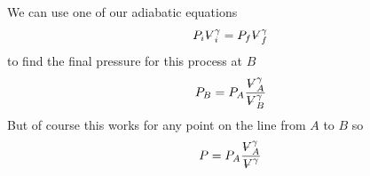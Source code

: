 \documentclass{article}
\begin{document}
We can use one of our adiabatic equations 
\[
P_{i}%
\ooalign{\hfil$V$\hfil\cr\kern0.1em--\hfil\cr}%
_{i}^{\gamma }=P_{f}%
\ooalign{\hfil$V$\hfil\cr\kern0.1em--\hfil\cr}%
_{f}^{\gamma } 
\]%
to find the final pressure for this process at $B$%
\[
P_{B}=P_{A}\frac{%
\ooalign{\hfil$V$\hfil\cr\kern0.1em--\hfil\cr}%
_{A}^{\gamma }}{%
\ooalign{\hfil$V$\hfil\cr\kern0.1em--\hfil\cr}%
_{B}^{\gamma }} 
\]%
But of course this works for any point on the line from $A$ to $B$ so 
\[
P=P_{A}\frac{%
\ooalign{\hfil$V$\hfil\cr\kern0.1em--\hfil\cr}%
_{A}^{\gamma }}{%
\ooalign{\hfil$V$\hfil\cr\kern0.1em--\hfil\cr}%
^{\gamma }} 
\]
\end{document}
